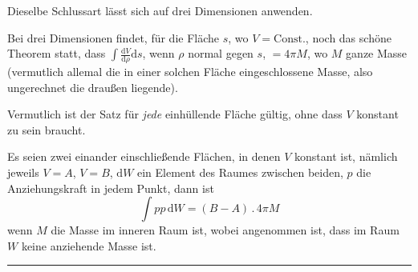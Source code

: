 Dieselbe Schlussart lässt sich auf drei Dimensionen anwenden.


Bei drei Dimensionen findet, für die Fläche $s$, wo $V=\mathrm{Const.}$, noch das
schöne Theorem statt, dass $\int\frac{\mathrm{d}V}{\mathrm{d}\rho}\mathrm{d}s$,
wenn $\rho$ normal gegen $s$, $=4\pi M$, wo $M$
ganze Masse (vermutlich allemal die in einer solchen Fläche eingeschlossene
Masse, also ungerechnet die draußen liegende).

Vermutlich ist der Satz für \emph{jede} einhüllende Fläche gültig, ohne dass $V$
konstant zu sein braucht.


Es seien zwei einander einschließende Flächen, in denen $V$ konstant ist,
nämlich jeweils $V=A$, $V=B$, $\mathrm{d}W$ ein Element des Raumes zwischen beiden,
$p$ die Anziehungskraft in jedem Punkt, dann ist
\[
\int pp\,\mathrm{d}W=(B-A)\, .\,4\pi M
\]
wenn $M$ die Masse im inneren Raum ist, wobei angenommen ist, dass im Raum
$W$ keine anziehende Masse ist.

\par\nopagebreak\begin{center}\rule{93.96bp}{0.35pt}\end{center}

\clearpage
\endgroup
